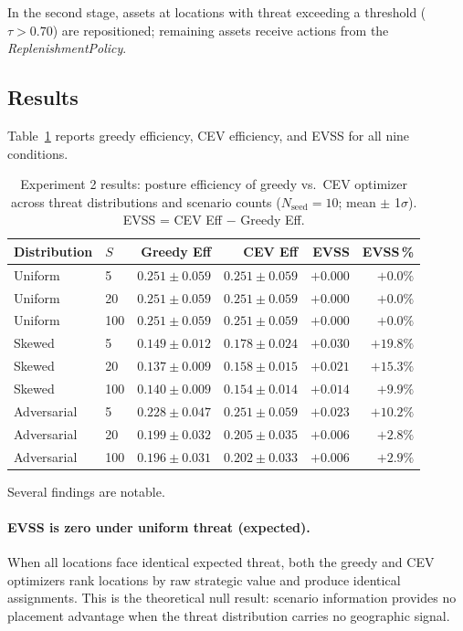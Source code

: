 \documentclass[11pt]{article}
\begin{document}
In the second stage, assets at locations with threat exceeding a
threshold ($\tau > 0.70$) are repositioned; remaining assets receive
actions from the \emph{ReplenishmentPolicy}.

\subsection{Results}
\label{sec:exp2:results}

Table~\ref{tab:exp2_evss} reports greedy efficiency, CEV efficiency, and
EVSS for all nine conditions.

\begin{table}[htbp]
\centering
\caption{Experiment 2 results: posture efficiency of greedy vs.\ CEV
optimizer across threat distributions and scenario counts
($N_\mathrm{seed}=10$; mean $\pm$ 1$\sigma$).
EVSS = CEV Eff $-$ Greedy Eff.}
\label{tab:exp2_evss}
\begin{tabular}{llrrrr}
\toprule
Distribution & $S$ & Greedy Eff & CEV Eff & EVSS & EVSS\,\% \\
\midrule
Uniform      &   5 & $0.251 \pm 0.059$ & $0.251 \pm 0.059$ & $+0.000$ & $+0.0\%$ \\
Uniform      &  20 & $0.251 \pm 0.059$ & $0.251 \pm 0.059$ & $+0.000$ & $+0.0\%$ \\
Uniform      & 100 & $0.251 \pm 0.059$ & $0.251 \pm 0.059$ & $+0.000$ & $+0.0\%$ \\
\midrule
Skewed       &   5 & $0.149 \pm 0.012$ & $0.178 \pm 0.024$ & $+0.030$ & $+19.8\%$ \\
Skewed       &  20 & $0.137 \pm 0.009$ & $0.158 \pm 0.015$ & $+0.021$ & $+15.3\%$ \\
Skewed       & 100 & $0.140 \pm 0.009$ & $0.154 \pm 0.014$ & $+0.014$ & $+9.9\%$ \\
\midrule
Adversarial  &   5 & $0.228 \pm 0.047$ & $0.251 \pm 0.059$ & $+0.023$ & $+10.2\%$ \\
Adversarial  &  20 & $0.199 \pm 0.032$ & $0.205 \pm 0.035$ & $+0.006$ & $+2.8\%$ \\
Adversarial  & 100 & $0.196 \pm 0.031$ & $0.202 \pm 0.033$ & $+0.006$ & $+2.9\%$ \\
\bottomrule
\end{tabular}
\end{table}

Several findings are notable.

\paragraph{EVSS is zero under uniform threat (expected).}
When all locations face identical expected threat, both the greedy and
CEV optimizers rank locations by raw strategic value and produce
identical assignments.  This is the theoretical null result: scenario
information provides no placement advantage when the threat distribution
carries no geographic signal.
\end{document}
